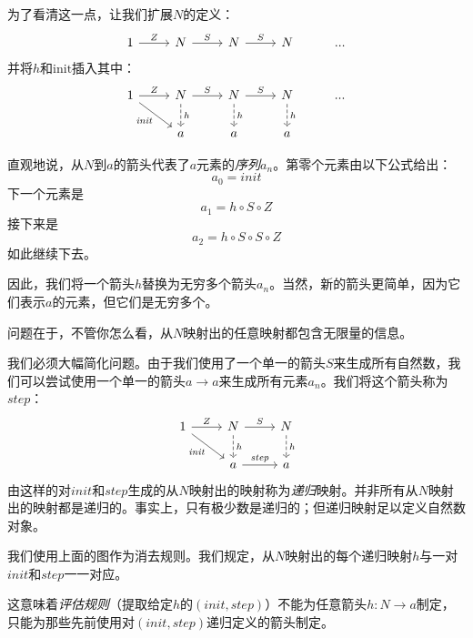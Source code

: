 \documentclass[DaoFP]{subfiles}
\begin{document}
    为了看清这一点，让我们扩展$N$的定义：
    \[
        \begin{tikzcd}
            1
            \arrow[r, "Z"]
            &N
            \arrow[r, "S"]
            &N
            \arrow[r, "S"]
            &N
            & ...
        \end{tikzcd}
    \]
    并将$h$和$\text{init}$插入其中：
    \[
        \begin{tikzcd}
            1
            \arrow[r, "Z"]
            \arrow[rd, "\mathit{init}"']
            &N
            \arrow[r, "S"]
            \arrow[d, dashed, "h"]
            &N
            \arrow[r, "S"]
            \arrow[d, dashed, "h"]
            &N
            \arrow[d, dashed, "h"]
            & ...
            \\
            & a
            & a
            & a
        \end{tikzcd}
    \]

    直观地说，从$N$到$a$的箭头代表了$a$元素的\emph{序列}$a_n$。第零个元素由以下公式给出：
    \[a_0=\mathit{init}\]
    下一个元素是
    \[a_1 = h \circ S \circ Z \]
    接下来是
    \[a_2 = h \circ S \circ S \circ Z \]
    如此继续下去。

    因此，我们将一个箭头$h$替换为无穷多个箭头$a_n$。当然，新的箭头更简单，因为它们表示$a$的元素，但它们是无穷多个。

    问题在于，不管你怎么看，从$N$映射出的任意映射都包含无限量的信息。

    我们必须大幅简化问题。由于我们使用了一个单一的箭头$S$来生成所有自然数，我们可以尝试使用一个单一的箭头$a \to a$来生成所有元素$a_n$。我们将这个箭头称为$\mathit{step}$：
    \[
        \begin{tikzcd}
            1
            \arrow[r, "Z"]
            \arrow[rd, "\mathit{init}"']
            &N
            \arrow[r, "S"]
            \arrow[d, dashed, "h"]
            &N
            \arrow[d, dashed, "h"]
            \\
            & a
            \arrow[r, "\mathit{step}"]
            & a
        \end{tikzcd}
    \]
    由这样的对$\mathit{init}$和$\mathit{step}$生成的从$N$映射出的映射称为\emph{递归}映射。并非所有从$N$映射出的映射都是递归的。事实上，只有极少数是递归的；但递归映射足以定义自然数对象。

    我们使用上面的图作为消去规则。我们规定，从$N$映射出的每个递归映射$h$与一对$\mathit{init}$和$\mathit{step}$一一对应。

    这意味着\emph{评估规则}（提取给定$h$的$(\mathit{init}, \mathit{step})$）不能为任意箭头$h \colon N \to a$制定，只能为那些先前使用对$(\mathit{init}, \mathit{step})$递归定义的箭头制定。
\end{document}

